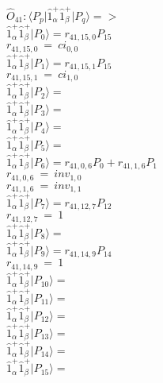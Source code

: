 \documentclass[14pt]{article}
\begin{document}
    $\hat{O}_{41}:  \langle{P_p}\vert \hat{1}_{\alpha}^{+}\hat{1}_{\beta}^{+} \vert{P_q}\rangle => $ \\ 
    $ \hat{1}_{\alpha}^{+}\hat{1}_{\beta}^{+} \vert{P_{0}}\rangle = {r}_{41,15,0}P_{15} $ \\ 
    ${r}_{41,15,0}\ =\ {ci}_{0,0} $ \\ 
    $ \hat{1}_{\alpha}^{+}\hat{1}_{\beta}^{+} \vert{P_{1}}\rangle = {r}_{41,15,1}P_{15} $ \\ 
    ${r}_{41,15,1}\ =\ {ci}_{1,0} $ \\ 
    $ \hat{1}_{\alpha}^{+}\hat{1}_{\beta}^{+} \vert{P_{2}}\rangle =  $ \\ 
    $ \hat{1}_{\alpha}^{+}\hat{1}_{\beta}^{+} \vert{P_{3}}\rangle =  $ \\ 
    $ \hat{1}_{\alpha}^{+}\hat{1}_{\beta}^{+} \vert{P_{4}}\rangle =  $ \\ 
    $ \hat{1}_{\alpha}^{+}\hat{1}_{\beta}^{+} \vert{P_{5}}\rangle =  $ \\ 
    $ \hat{1}_{\alpha}^{+}\hat{1}_{\beta}^{+} \vert{P_{6}}\rangle = {r}_{41,0,6}P_{0}+{r}_{41,1,6}P_{1} $ \\ 
    ${r}_{41,0,6}\ =\ {inv}_{1,0} $ \\ 
    ${r}_{41,1,6}\ =\ {inv}_{1,1} $ \\ 
    $ \hat{1}_{\alpha}^{+}\hat{1}_{\beta}^{+} \vert{P_{7}}\rangle = {r}_{41,12,7}P_{12} $ \\ 
    ${r}_{41,12,7}\ =\ 1 $ \\ 
    $ \hat{1}_{\alpha}^{+}\hat{1}_{\beta}^{+} \vert{P_{8}}\rangle =  $ \\ 
    $ \hat{1}_{\alpha}^{+}\hat{1}_{\beta}^{+} \vert{P_{9}}\rangle = {r}_{41,14,9}P_{14} $ \\ 
    ${r}_{41,14,9}\ =\ 1 $ \\ 
    $ \hat{1}_{\alpha}^{+}\hat{1}_{\beta}^{+} \vert{P_{10}}\rangle =  $ \\ 
    $ \hat{1}_{\alpha}^{+}\hat{1}_{\beta}^{+} \vert{P_{11}}\rangle =  $ \\ 
    $ \hat{1}_{\alpha}^{+}\hat{1}_{\beta}^{+} \vert{P_{12}}\rangle =  $ \\ 
    $ \hat{1}_{\alpha}^{+}\hat{1}_{\beta}^{+} \vert{P_{13}}\rangle =  $ \\ 
    $ \hat{1}_{\alpha}^{+}\hat{1}_{\beta}^{+} \vert{P_{14}}\rangle =  $ \\ 
    $ \hat{1}_{\alpha}^{+}\hat{1}_{\beta}^{+} \vert{P_{15}}\rangle =  $ \\ 
    
\end{document}
